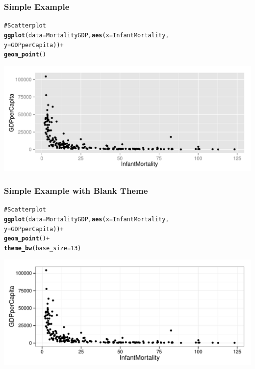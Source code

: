 \documentclass{beamer}\usepackage{graphicx, color}
\makeatletter
\def\maxwidth{ %
  \ifdim\Gin@nat@width>\linewidth
    \linewidth
  \else
    \Gin@nat@width
  \fi
}
\newcommand{\hlfunctioncall}[1]{\textcolor[rgb]{0.501960784313725,0,0.329411764705882}{\textbf{#1}}}%
\newcommand{\hlcomment}[1]{\textcolor[rgb]{0.180392156862745,0.6,0.341176470588235}{#1}}%
\newenvironment{kframe}{%
 \def\at@end@of@kframe{}%
 \ifinner\ifhmode%
  \def\at@end@of@kframe{\end{minipage}}%
  \begin{minipage}{\columnwidth}%
 \fi\fi%
 \def\FrameCommand##1{\hskip\@totalleftmargin \hskip-\fboxsep
 \colorbox{shadecolor}{##1}\hskip-\fboxsep
     \hskip-\linewidth \hskip-\@totalleftmargin \hskip\columnwidth}%
 \MakeFramed {\advance\hsize-\width
   \@totalleftmargin\z@ \linewidth\hsize
   \@setminipage}}%
 {\par\unskip\endMakeFramed%
 \at@end@of@kframe}
\newenvironment{knitrout}{}{} %
\makeatother
\begin{document}
\begin{frame}[fragile]
  \frametitle{Simple Example}
\begin{knitrout}
\color{fgcolor}\begin{kframe}
\begin{alltt}
\hlcomment{# Scatterplot}
\hlfunctioncall{ggplot}(data = MortalityGDP, \hlfunctioncall{aes}(x = InfantMortality, 
                                y = GDPperCapita)) +
      \hlfunctioncall{geom_point}()
\end{alltt}
\end{kframe}

{\centering \includegraphics[width=\maxwidth]{figure/ggScatterSimple} 

}


\end{knitrout}

\end{frame}

\begin{frame}[fragile]
  \frametitle{Simple Example with Blank Theme}
\begin{knitrout}
\color{fgcolor}\begin{kframe}
\begin{alltt}
\hlcomment{# Scatterplot}
\hlfunctioncall{ggplot}(data = MortalityGDP, \hlfunctioncall{aes}(x = InfantMortality, 
                                y = GDPperCapita)) +
      \hlfunctioncall{geom_point}() +
      \hlfunctioncall{theme_bw}(base_size = 13)
\end{alltt}
\end{kframe}

{\centering \includegraphics[width=\maxwidth]{figure/ggScatterSimpleBlank} 

}


\end{knitrout}

\end{frame}
\end{document}
